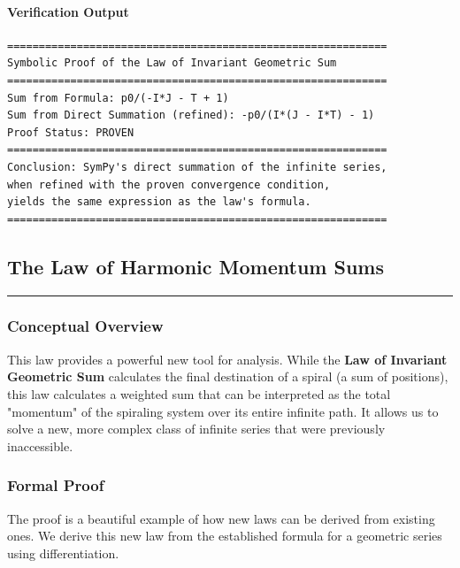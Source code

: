 \paragraph{Verification Output}
\begin{verbatim}
============================================================
Symbolic Proof of the Law of Invariant Geometric Sum
============================================================
Sum from Formula: p0/(-I*J - T + 1)
Sum from Direct Summation (refined): -p0/(I*(J - I*T) - 1)
Proof Status: PROVEN
============================================================
Conclusion: SymPy's direct summation of the infinite series,
when refined with the proven convergence condition,
yields the same expression as the law's formula.
============================================================
\end{verbatim}

\subsection*{The Law of Harmonic Momentum Sums}
\hrule
\vspace{0.3cm}
\vspace{0.5cm}

\subsubsection*{Conceptual Overview}
This law provides a powerful new tool for analysis. While the \textbf{Law of Invariant Geometric Sum} calculates the final destination of a spiral (a sum of positions), this law calculates a weighted sum that can be interpreted as the total "momentum" of the spiraling system over its entire infinite path. It allows us to solve a new, more complex class of infinite series that were previously inaccessible.

\subsubsection*{Formal Proof}
The proof is a beautiful example of how new laws can be derived from existing ones. We derive this new law from the established formula for a geometric series using differentiation.

